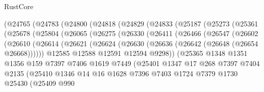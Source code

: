\begin{lexlean}{RustCore}
\begin{coremodule}
    (@24765
      (@24783
        (@24800
          (@24818
            (@24829
              (@24833
                (@25187
                  (@25273
                    (@25361
                      (@25678
                        (@25804
                          (@26065
                            (@26275
                              (@26330
                                (@26411
                                  (@26466
                                    (@26547
                                      (@26602
                                        (@26610
                                          (@26614
                                            (@26621
                                              (@26624
                                                (@26630 (@26636 (@26642 (@26648 (@26654 @26668))))))
                                              @12585
                                              @12588
                                              @12591
                                              @12594
                                              @9298))
                                          (@25365
                                            @1348
                                            @1351
                                            @1356
                                            @159
                                            @7397
                                            @7406
                                            @1619
                                            @7449
                                            (@25401
                                              @1347
                                              @17
                                              @268
                                              @7397
                                              @7404
                                              @2135
                                              (@25410
                                                @1346
                                                @14
                                                @16
                                                @1628
                                                @7396
                                                @7403
                                                @1724
                                                @7379
                                                @1730
                                                @25430
                                                (@25409
                                                  @990

\end{coremodule}
\end{lexlean}
